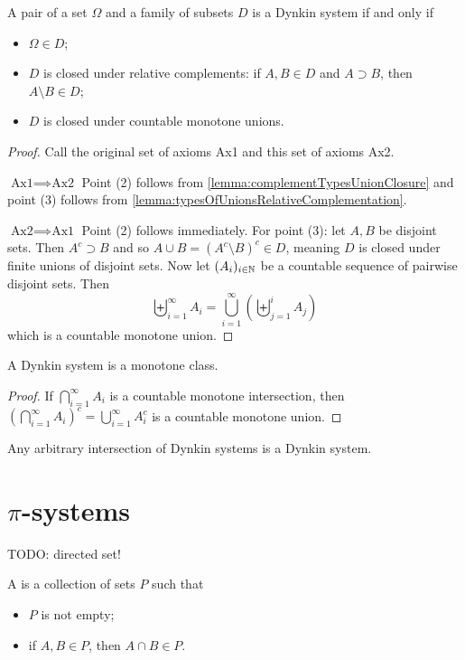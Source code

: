 \begin{lemma}
A pair of a set $\Omega$ and a family of subsets $D$ is a Dynkin system \textup{if and only if}
\begin{itemize}
\item $\Omega\in D$;
\item $D$ is closed under relative complements: if $A,B\in D$ and $A\supset B$, then $A\setminus B\in D$;
\item $D$ is closed under countable monotone unions.
\end{itemize}
\end{lemma}
\begin{proof}
Call the original set of axioms Ax1 and this set of axioms Ax2.

$\boxed{\text{Ax1}\implies\text{Ax2}}$ Point (2) follows from \ref{lemma:complementTypesUnionClosure} and point (3) follows from \ref{lemma:typesOfUnionsRelativeComplementation}.

$\boxed{\text{Ax2}\implies\text{Ax1}}$ Point (2) follows immediately. For point (3): let $A,B$ be disjoint sets. Then $A^c \supset B$ and so $A\cup B = (A^c\setminus B)^c \in D$, meaning $D$ is closed under finite unions of disjoint sets. Now let $(A_i)_{i\in\mathbb{N}}$ be a countable sequence of pairwise disjoint sets. Then
\[ \biguplus_{i=1}^\infty A_i = \bigcup_{i=1}^\infty \left(\biguplus_{j=1}^i A_j\right) \]
which is a countable monotone union.
\end{proof}

\begin{lemma}
A Dynkin system is a monotone class.
\end{lemma}
\begin{proof}
If $\bigcap_{i=1}^\infty A_i$ is a countable monotone intersection, then $\left(\bigcap_{i=1}^\infty A_i\right)^c = \bigcup_{i=1}^\infty A_i^c$ is a countable monotone union.
\end{proof}
\begin{lemma}
Any arbitrary intersection of Dynkin systems is a Dynkin system.
\end{lemma}

\section{$\pi$-systems}
TODO: directed set!
\begin{definition}
A  is a collection of sets $P$ such that
\begin{itemize}
\item $P$ is not empty;
\item if $A,B\in P$, then $A\cap B\in P$.
\end{itemize}
\end{definition}

